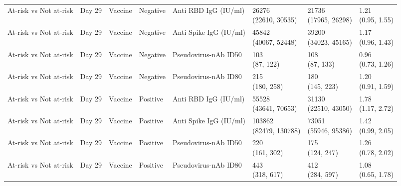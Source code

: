 \documentclass[]{book}
\theoremstyle{definition}
\theoremstyle{definition}
\theoremstyle{definition}
\newcommand{\1}{\mathbbm{1}}
\begin{document}
\begin{landscape}
\begin{ThreePartTable}
\begin{longtable}[t]{>{\raggedright\arraybackslash}p{2.7cm}lllllll}
At-risk vs Not at-risk & Day 29 & Vaccine & Negative & Anti RBD IgG (IU/ml) & \makecell[l]{26276\\(22610, 30535)} & \makecell[l]{21736\\(17965, 26298)} & \makecell[l]{1.21\\(0.95, 1.55)}\\
\addlinespace
At-risk vs Not at-risk & Day 29 & Vaccine & Negative & Anti Spike IgG (IU/ml) & \makecell[l]{45842\\(40067, 52448)} & \makecell[l]{39200\\(34023, 45165)} & \makecell[l]{1.17\\(0.96, 1.43)}\\
At-risk vs Not at-risk & Day 29 & Vaccine & Negative & Pseudovirus-nAb ID50 & \makecell[l]{103\\(87, 122)} & \makecell[l]{108\\(87, 133)} & \makecell[l]{0.96\\(0.73, 1.26)}\\
At-risk vs Not at-risk & Day 29 & Vaccine & Negative & Pseudovirus-nAb ID80 & \makecell[l]{215\\(180, 258)} & \makecell[l]{180\\(145, 223)} & \makecell[l]{1.20\\(0.91, 1.59)}\\
At-risk vs Not at-risk & Day 29 & Vaccine & Positive & Anti RBD IgG (IU/ml) & \makecell[l]{55528\\(43641, 70653)} & \makecell[l]{31130\\(22510, 43050)} & \makecell[l]{1.78\\(1.17, 2.72)}\\
At-risk vs Not at-risk & Day 29 & Vaccine & Positive & Anti Spike IgG (IU/ml) & \makecell[l]{103862\\(82479, 130788)} & \makecell[l]{73051\\(55946, 95386)} & \makecell[l]{1.42\\(0.99, 2.05)}\\
\addlinespace
At-risk vs Not at-risk & Day 29 & Vaccine & Positive & Pseudovirus-nAb ID50 & \makecell[l]{220\\(161, 302)} & \makecell[l]{175\\(124, 247)} & \makecell[l]{1.26\\(0.78, 2.02)}\\
At-risk vs Not at-risk & Day 29 & Vaccine & Positive & Pseudovirus-nAb ID80 & \makecell[l]{443\\(318, 617)} & \makecell[l]{412\\(284, 597)} & \makecell[l]{1.08\\(0.65, 1.78)}\\

\end{longtable}
\end{ThreePartTable}
\end{landscape}
\end{document}

